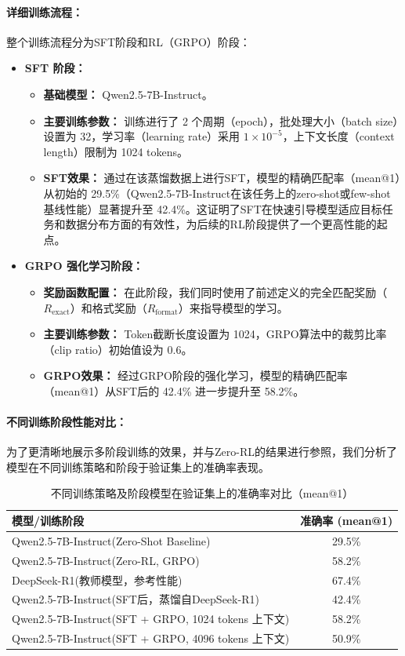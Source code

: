 \documentclass{pkuthesis}
\newcommand{\qwen}{Qwen2.5-7B-Instruct}
\newcommand{\deepseekr}{DeepSeek-R1}
\begin{document}
\paragraph{详细训练流程：}
整个训练流程分为SFT阶段和RL（GRPO）阶段：
\begin{itemize}
    \item \textbf{SFT 阶段：}
    \begin{itemize}
        \item \textbf{基础模型：} \qwen。
        \item \textbf{主要训练参数：} 训练进行了 2 个周期（epoch），批处理大小（batch size）设置为 32，学习率（learning rate）采用 $1 \times 10^{-5}$，上下文长度（context length）限制为 1024 tokens。
        \item \textbf{SFT效果：} 通过在该蒸馏数据上进行SFT，模型的精确匹配率（mean@1）从初始的 29.5\%（\qwen 在该任务上的zero-shot或few-shot基线性能）显著提升至 42.4\%。这证明了SFT在快速引导模型适应目标任务和数据分布方面的有效性，为后续的RL阶段提供了一个更高性能的起点。
    \end{itemize}
    \item \textbf{GRPO 强化学习阶段：}
    \begin{itemize}
        \item \textbf{奖励函数配置：} 在此阶段，我们同时使用了前述定义的完全匹配奖励（$R_{\mathrm{exact}}$）和格式奖励（$R_{\mathrm{format}}$）来指导模型的学习。
        \item \textbf{主要训练参数：} Token截断长度设置为 1024，GRPO算法中的裁剪比率（clip ratio）初始值设为 0.6。
        \item \textbf{GRPO效果：} 经过GRPO阶段的强化学习，模型的精确匹配率（mean@1）从SFT后的 42.4\% 进一步提升至 58.2\%。
    \end{itemize}
\end{itemize}

\paragraph{不同训练阶段性能对比：}
为了更清晰地展示多阶段训练的效果，并与Zero-RL的结果进行参照，我们分析了模型在不同训练策略和阶段于验证集上的准确率表现。

\begin{table}[h]
\centering
\caption{不同训练策略及阶段模型在验证集上的准确率对比（mean@1）}
\label{tab:acc_distill_sft_grpo_revised} %
\begin{tabular}{l|c}
\hline
模型/训练阶段 & 准确率 (mean@1) \\
\hline
\qwen (Zero-Shot Baseline) & 29.5\% \\ %
\qwen (Zero-RL, GRPO) & 58.2\% \\ %
\hline
\deepseekr (教师模型，参考性能) & 67.4\% \\
\qwen (SFT后，蒸馏自\deepseekr) & 42.4\% \\
\qwen (SFT + GRPO, 1024 tokens 上下文) & 58.2\% \\
\qwen (SFT + GRPO, 4096 tokens 上下文) & 50.9\% \\
\hline
\end{tabular}
\end{table}
\end{document}
